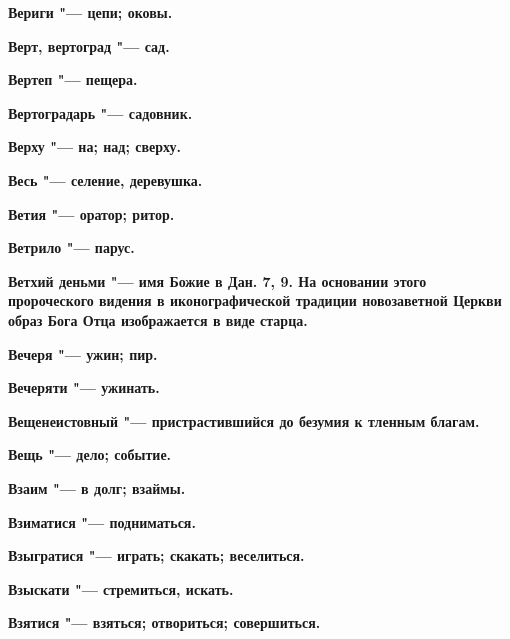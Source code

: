 \bfseries Вериги \normalfont{} "--- цепи; оковы. 




\bfseries Верт, вертоград \normalfont{} "--- сад. 




\bfseries Вертеп \normalfont{} "--- пещера. 




\bfseries Вертоградарь \normalfont{} "--- садовник. 




\bfseries Верху \normalfont{} "--- на; над; сверху. 




\bfseries Весь \normalfont{} "--- селение, деревушка. 




\bfseries Ветия \normalfont{} "--- оратор; ритор. 




\bfseries Ветрило \normalfont{} "--- парус. 




\bfseries Ветхий деньми \normalfont{} "--- имя Божие в Дан. 7, 9. На основании этого пророческого видения в иконографической традиции новозаветной Церкви образ Бога Отца изображается в виде старца. 




\bfseries Вечеря \normalfont{} "--- ужин; пир. 




\bfseries Вечеряти \normalfont{} "--- ужинать. 




\bfseries Вещенеистовный \normalfont{} "--- пристрастившийся до безумия к тленным благам. 




\bfseries Вещь \normalfont{} "--- дело; событие. 




\bfseries Взаим \normalfont{} "--- в долг; взаймы. 




\bfseries Взиматися \normalfont{} "--- подниматься. 




\bfseries Взыгратися \normalfont{} "--- играть; скакать; веселиться. 




\bfseries Взыскати \normalfont{} "--- стремиться, искать. 




\bfseries Взятися \normalfont{} "--- взяться; отвориться; совершиться. 




